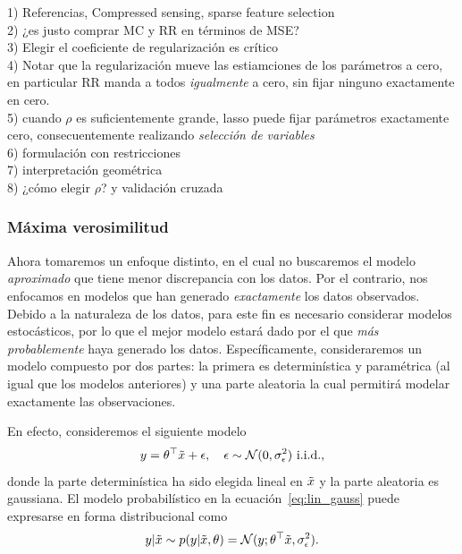 \begin{mdframed}[style=pendiente, frametitle={\center Regularización versus mínimos cuadrados}]
1) Referencias, Compressed sensing, sparse feature selection\\
2) ¿es justo comprar MC y RR en términos de MSE?\\
3) Elegir el coeficiente de regularización es crítico\\
4) Notar que la regularización mueve las estiamciones de los parámetros a cero, en particular RR manda a todos \emph{igualmente} a cero, sin fijar ninguno exactamente en cero. \\
5) cuando $\rho$ es suficientemente grande, lasso puede fijar parámetros exactamente cero, consecuentemente realizando \emph{selección de variables}\\
6) formulación con restricciones\\
7) interpretación geométrica\\
8) ¿cómo elegir $\rho$? y validación cruzada
\end{mdframed}

\subsubsection{Máxima verosimilitud} %
\label{ssub:max_ver}

Ahora tomaremos un enfoque distinto, en el cual no buscaremos el modelo \emph{aproximado} que tiene menor discrepancia con los datos. Por el contrario, nos enfocamos en modelos que han generado \emph{exactamente} los datos observados. Debido a la naturaleza de los datos, para este fin es necesario considerar modelos estocásticos, por lo que el mejor modelo estará dado por el que \emph{más probablemente} haya generado los datos. Específicamente, consideraremos un modelo compuesto por dos partes: la primera es determinística y paramétrica (al igual que los modelos anteriores) y una parte aleatoria la cual permitirá modelar exactamente las observaciones. 

En efecto, consideremos el siguiente modelo
\begin{equation}
	y = \theta^\top\tilde{x} + \epsilon,\quad \epsilon\sim{\mathcal N}(0,\sigma_\epsilon^2) \ \text{i.i.d.},
	\label{eq:lin_gauss}
\end{equation}
donde la parte determinística ha sido elegida lineal en $\tilde{x}$ y la parte aleatoria es gaussiana. El modelo probabilístico en la ecuación~\eqref{eq:lin_gauss} puede expresarse en forma distribucional como 
\begin{equation}
	y|\tilde{x} \sim p(y|\tilde{x},\theta) = {\mathcal N}(y;\theta^\top\tilde{x},\sigma_\epsilon^2).
\end{equation}

